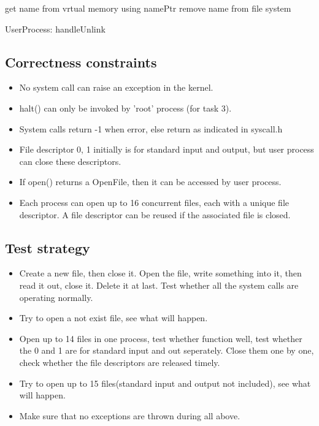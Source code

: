\documentclass[a4paper,10pt]{article}
\begin{document}
\begin{algorithm}
\DontPrintSemicolon
{}
get name from vrtual memory using namePtr\;
remove name from file system\;
\caption{UserProcess: handleUnlink}
\label{algo:unlink}
\end{algorithm}

\subsection{Correctness constraints}
\begin{itemize}
\item No system call can raise an exception in the kernel.
\item halt() can only be invoked by 'root' process (for task 3).
\item System calls return -1 when error, else return as indicated in syscall.h
\item File descriptor 0, 1 initially is for standard input and output, but user process can close these descriptors.
\item If open() returns a OpenFile, then it can be accessed by user process.
\item Each process can open up to 16 concurrent files, each with a unique file descriptor. A file descriptor can be reused if the associated file is closed.
\end{itemize}

\subsection{Test strategy}
\begin{itemize}
\item Create a new file, then close it. Open the file, write something into it, then read it out, close it. Delete it at last. Test whether all the system calls are operating normally.
\item Try to open a not exist file, see what will happen.
\item Open up to 14 files in one process, test whether function well, test whether the 0 and 1 are for standard input and out seperately. Close them one by one, check whether the file descriptors are released timely.
\item Try to open up to 15 files(standard input and output not included), see what will happen.
\item Make sure that no exceptions are thrown during all above.
\end{itemize}
\end{document}
